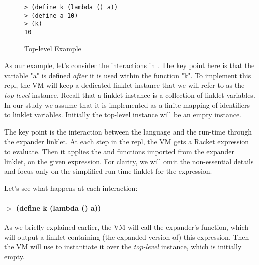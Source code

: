 \begin{wrapfigure}[9]{r}{0.3\textwidth}
  \vspace{-0.6cm}
  \begin{mdframed}
    \begin{verbatim}
> (define k (lambda () a))
> (define a 10)
> (k)
10
\end{verbatim}
    \caption{Top-level Example}
    \label{fig:toplevel-interaction}
  \end{mdframed}
\end{wrapfigure}

As our example, let's consider the interactions in
. The key point here is that the
variable "a" is defined \emph{after} it is used within the function
"k". To implement this repl, the VM will keep a dedicated linklet
instance that we will refer to as the \emph{top-level}
instance. Recall that a linklet instance is a collection of linklet
variables. In our study we assume that it is implemented as a finite
mapping of identifiers to linklet variables. Initially the top-level
instance will be an empty instance.

The key point is the interaction between the language and the run-time
through the expander linklet. At each step in the repl, the VM gets a
Racket expression to evaluate. Then it applies the 
and  functions imported from the expander linklet,
on the given expression. For clarity, we will omit the non-essential
details and focus only on the simplified run-time linklet for the
expression.

Let's see what happens at each interaction:

\paragraph{$>$ (define k (lambda () a))}

As we briefly explained earlier, the VM will call the expander's
 function, which will output a linklet containing (the
expanded version of) this expression. Then the VM will use
 to instantiate it over the \emph{top-level}
instance, which is initially empty.

